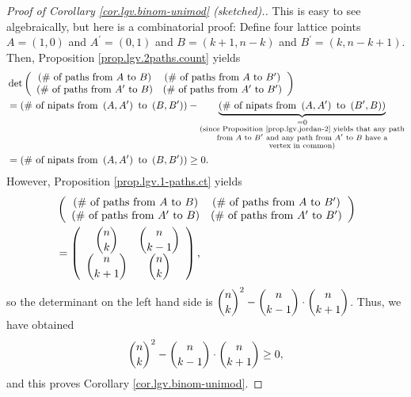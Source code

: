 \begin{definition}
\begin{proof}
[Proof of Corollary \ref{cor.lgv.binom-unimod} (sketched).]This is easy to see
algebraically, but here is a combinatorial proof: Define four lattice points
$A=\left(  1,0\right)  $ and $A^{\prime}=\left(  0,1\right)  $ and $B=\left(
k+1,n-k\right)  $ and $B^{\prime}=\left(  k,n-k+1\right)  $. Then, Proposition
\ref{prop.lgv.2paths.count} yields%
\begin{align*}
&  \det\left(
\begin{array}
[c]{cc}%
\left(  \text{\# of paths from }A\text{ to }B\right)  & \left(  \text{\# of
paths from }A\text{ to }B^{\prime}\right) \\
\left(  \text{\# of paths from }A^{\prime}\text{ to }B\right)  & \left(
\text{\# of paths from }A^{\prime}\text{ to }B^{\prime}\right)
\end{array}
\right) \\
&  =\left(  \text{\# of nipats from }\left(  A,A^{\prime}\right)  \text{ to
}\left(  B,B^{\prime}\right)  \right)  -\underbrace{\left(  \text{\# of nipats
from }\left(  A,A^{\prime}\right)  \text{ to }\left(  B^{\prime},B\right)
\right)  }_{\substack{=0\\\text{(since Proposition \ref{prop.lgv.jordan-2}
yields that any path}\\\text{from }A\text{ to }B^{\prime}\text{ and any path
from }A^{\prime}\text{ to }B\text{ have a}\\\text{vertex in common)}}}\\
&  =\left(  \text{\# of nipats from }\left(  A,A^{\prime}\right)  \text{ to
}\left(  B,B^{\prime}\right)  \right)  \geq0.
\end{align*}
However, Proposition \ref{prop.lgv.1-paths.ct} yields
\begin{align*}
&  \left(
\begin{array}
[c]{cc}%
\left(  \text{\# of paths from }A\text{ to }B\right)  & \left(  \text{\# of
paths from }A\text{ to }B^{\prime}\right) \\
\left(  \text{\# of paths from }A^{\prime}\text{ to }B\right)  & \left(
\text{\# of paths from }A^{\prime}\text{ to }B^{\prime}\right)
\end{array}
\right) \\
&  =\left(
\begin{array}
[c]{cc}%
\dbinom{n}{k} & \dbinom{n}{k-1}\\
\dbinom{n}{k+1} & \dbinom{n}{k}%
\end{array}
\right)  ,
\end{align*}
so the determinant on the left hand side is $\dbinom{n}{k}^{2}-\dbinom{n}%
{k-1}\cdot\dbinom{n}{k+1}$. Thus, we have obtained%
\[
\dbinom{n}{k}^{2}-\dbinom{n}{k-1}\cdot\dbinom{n}{k+1}\geq0,
\]
and this proves Corollary \ref{cor.lgv.binom-unimod}.
\end{proof}


\end{definition}
